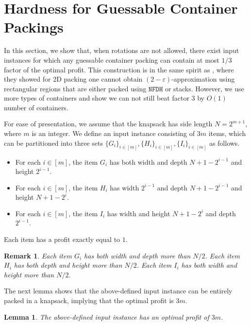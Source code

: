 \documentclass[10pt,a4paper]{amsart}
\newcommand{\eps}{\varepsilon}
\newcommand{\NFDH}{\texttt{NFDH}\xspace}
\newtheorem{lemma}[theorem]{Lemma}
\newtheorem{remark}[theorem]{Remark}
\theoremstyle{definition}
\begin{document}
\section{Hardness for Guessable Container Packings}
\label{sec:hardnesscontainer}
In this section, we show that, when rotations are not allowed, there exist input instances for which any guessable container packing can contain at most $1/3$ factor of the optimal profit.
This construction is in the same spirit as \cite{2dks-Lpacking}, where they showed for 2D packing one cannot obtain $(2-\eps)$-approximation using rectangular regions that are either packed using $\NFDH$ or stacks.
However, we use more types of containers and show we can not still beat factor 3 by $O(1)$ number of containers. 

For ease of presentation, we assume that the knapsack has side length $N=2^{m+1}$, where $m$ is an integer. 
We define an input instance consisting of $3m$ items, which can be partitioned into three sets $\{G_i\}_{i\in[m]},\{H_i\}_{i\in[m]},\{I_i\}_{i\in[m]}$ as follows.
\begin{itemize}
    \item For each $i\in[m]$, the item $G_i$ has both width and depth $N+1-2^{i-1}$ and height $2^{i-1}$.
    \item For each $i\in[m]$, the item $H_i$ has width $2^{i-1}$ and depth $N+1-2^{i-1}$ and height $N+1-2^{i}$.
    \item For each $i\in[m]$, the item $I_i$ has width and height $N+1-2^{i}$ and depth $2^{i-1}$.
\end{itemize}
Each item has a profit exactly equal to $1$.
\begin{remark}
    \label{remark:hardness}
    Each item $G_i$ has both width and depth more than $N/2$. Each item $H_i$ has both depth and height more than $N/2$. Each item $I_i$ has both width and height more than $N/2$.
\end{remark}
The next lemma shows that the above-defined input instance can be entirely packed in a knapsack, implying that the optimal profit is $3m$.
\begin{lemma}
    \label{lem:opt-hardness}
    The above-defined input instance has an optimal profit of $3m$.
\end{lemma}
\end{document}
